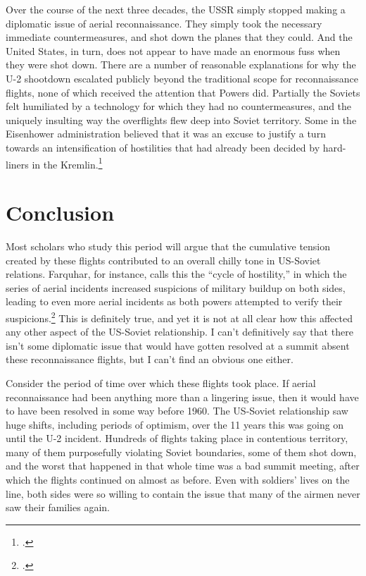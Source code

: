 \documentclass{report}
\begin{document}
\begin{refsegment}
Over the course of the next three decades, the USSR simply stopped making a diplomatic issue of aerial reconnaissance. They simply took the necessary immediate countermeasures, and shot down the planes that they could. And the United States, in turn, does not appear to have made an enormous fuss when they were shot down. There are a number of reasonable explanations for why the U-2 shootdown escalated publicly beyond the traditional scope for reconnaissance flights, none of which received the attention that Powers did. Partially the Soviets felt humiliated by a technology for which they had no countermeasures, and the uniquely insulting way the overflights flew deep into Soviet territory. Some in the Eisenhower administration believed that it was an excuse to justify a turn towards an intensification of hostilities that had already been decided by hard-liners in the Kremlin.\footcite[p.~328]{kistiakowsky_scientist_1976}

\section{Conclusion}
Most scholars who study this period will argue that the cumulative tension created by these flights contributed to an overall chilly tone in US-Soviet relations. Farquhar, for instance, calls this the ``cycle of hostility,'' in which the series of aerial incidents increased suspicions of military buildup on both sides, leading to even more aerial incidents as both powers attempted to verify their suspicions.\footcite[p.~43]{farquhar_aerial_2015} This is definitely true, and yet it is not at all clear how this affected any other aspect of the US-Soviet relationship. I can't definitively say that there isn't some diplomatic issue that would have gotten resolved at a summit absent these reconnaissance flights, but I can't find an obvious one either.

Consider the period of time over which these flights took place. If aerial reconnaissance had been anything more than a lingering issue, then it would have to have been resolved in some way before 1960. The US-Soviet relationship saw huge shifts, including periods of optimism, over the 11 years this was going on until the U-2 incident. Hundreds of flights taking place in contentious territory, many of them purposefully violating Soviet boundaries, some of them shot down, and the worst that happened in that whole time was a bad summit meeting, after which the flights continued on almost as before. Even with soldiers' lives on the line, both sides were so willing to contain the issue that many of the airmen never saw their families again.


\end{refsegment}
\end{document}
